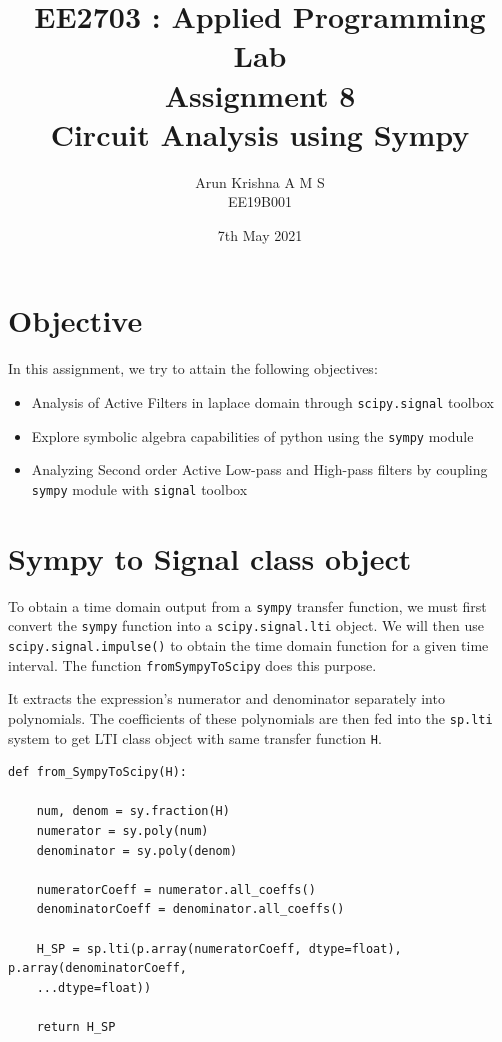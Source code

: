 \documentclass[12pt, a4paper]{report}
\title{\textbf{EE2703 : Applied Programming Lab \\ Assignment 8 \\ Circuit Analysis using Sympy}} %
\author{Arun Krishna A M S \\ EE19B001} %
\date{7th May 2021} %
\begin{document}
		
		
\maketitle %
\justifying

\section*{Objective}
In this assignment, we try to attain the following objectives: 
\begin{itemize}
  	\item Analysis of Active Filters in laplace domain through \texttt{scipy.signal} toolbox
    \item Explore symbolic algebra capabilities of python using the \texttt{sympy} module
  	\item Analyzing Second order Active Low-pass and High-pass filters by coupling \texttt{sympy} module with \texttt{signal} toolbox
\end{itemize}

\section*{Sympy to Signal class object}
To obtain a time domain output from a \texttt{sympy} transfer function, we must first convert the \texttt{sympy} function into a \texttt{scipy.signal.lti} object. We will then use \texttt{scipy.signal.impulse()} to obtain the time domain function for a given time interval.
The function \texttt{fromSympyToScipy} does this purpose. 

It extracts the expression's numerator and denominator separately into polynomials. The coefficients of these polynomials are then fed into the \texttt{sp.lti} system to get LTI class object with same transfer function \texttt{H}.


\begin{verbatim}
def from_SympyToScipy(H):

    num, denom = sy.fraction(H)
    numerator = sy.poly(num)     
    denominator = sy.poly(denom)   

    numeratorCoeff = numerator.all_coeffs()  
    denominatorCoeff = denominator.all_coeffs()  

    H_SP = sp.lti(p.array(numeratorCoeff, dtype=float), p.array(denominatorCoeff,
    ...dtype=float))

    return H_SP
\end{verbatim}
\end{document}
